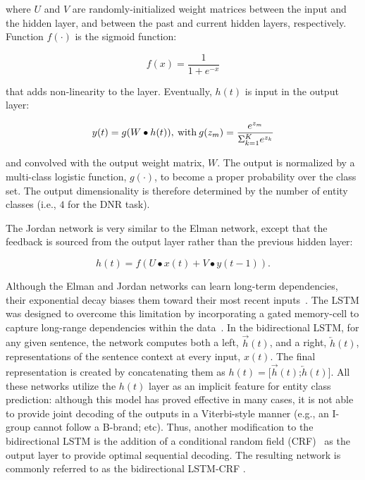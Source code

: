 \noindent where $U$ and $V$ are randomly-initialized weight matrices between the input and the hidden layer, and between the past and current hidden layers, respectively. Function $f(\cdot)$ is the sigmoid function:

\begin{equation}
f(x)=\frac{1}{1+e^{-x}}
\end{equation}

\noindent that adds non-linearity to the layer. Eventually, $h(t)$ is input in the output layer:

\vspace{-0.6 cm}

\begin{equation}
\label{eq4}
y(t) = g(W \bullet h(t)), \hspace{0.03in} \text{with} \hspace{0.03in}  g(z_{m}) = \frac{e^{z_{m}}} {\Sigma _{k=1}^Ke^{z_{k}} }
\end{equation}

\noindent and convolved with the output weight matrix, $W$. The output is normalized by a multi-class logistic function, $g(\cdot)$, to become a proper probability over the class set. The output dimensionality is therefore determined by the number of entity classes (i.e., $4$ for the DNR task).

The Jordan network is very similar to the Elman network, except that the feedback is sourced from the output layer rather than the previous hidden layer:


\begin{equation}
h(t) = f( U \bullet x(t) + V \bullet y(t-1) ).
\end{equation}


Although the Elman and Jordan networks can learn long-term dependencies, their exponential decay biases them toward their most recent inputs~\cite{bengio1994learning}. The LSTM was designed to overcome this limitation by incorporating a gated memory-cell to capture long-range dependencies within the data~\cite{hochreiter1997long}. In the bidirectional LSTM, for any given sentence, the network computes both a left, $\overrightarrow{h}(t)$, and a right, $\overleftarrow{ h}(t)$, representations of the sentence context at every input, $x(t)$. The final representation is created by concatenating them as $h(t) = [\overrightarrow{h}(t)$;$\overleftarrow{ h}(t)]$. All these networks utilize the $h(t)$ layer as an implicit feature for entity class prediction: although this model has proved effective in many cases, it is not able to provide joint decoding of the outputs in a Viterbi-style manner (e.g., an I-group cannot follow a B-brand; etc). Thus, another modification to the bidirectional LSTM is the addition of a conditional random field (CRF)~\cite{lafferty2001conditional} as the output layer to provide optimal sequential decoding. The resulting network is commonly referred to as the bidirectional LSTM-CRF \cite{lample2016neural}.
